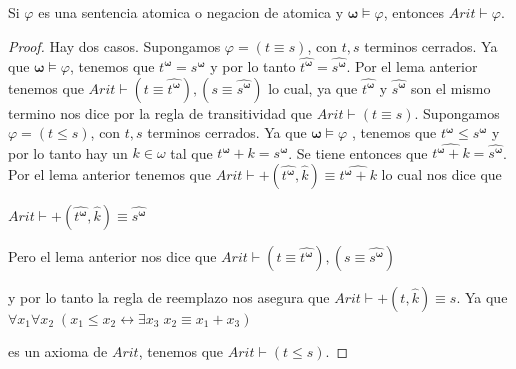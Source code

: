   \begin{lemma}
    Si \(\varphi \) es una sentencia atomica o negacion de atomica y \(\mathbf{ \omega }\models \varphi \), entonces \(Arit\vdash \varphi \).
  \end{lemma}
  \begin{proof}
    Hay dos casos. Supongamos \(\varphi =(t\equiv s)\), con \(t,s\) terminos cerrados. Ya que \(\mathbf{\omega }\models \varphi \), tenemos que \(t^{\mathbf{ \omega }}=s^{\mathbf{\omega }}\) y por lo tanto \(\widehat{t^{\mathbf{\omega }} }=\widehat{s^{\mathbf{\omega }}}\). Por el lema anterior tenemos que \( Arit\vdash (t\equiv \widehat{t^{\mathbf{\omega }}}),(s\equiv \widehat{s^{ \mathbf{\omega }}})\) lo cual, ya que \(\widehat{t^{\mathbf{\omega }}}\) y \( \widehat{s^{\mathbf{\omega }}}\) son el mismo termino nos dice por la regla de transitividad que \(Arit\vdash (t\equiv s)\). Supongamos \(\varphi =(t\leq s) \), con \(t,s\) terminos cerrados. Ya que \(\mathbf{\omega }\models \varphi \) , tenemos que \(t^{\mathbf{\omega }}\leq s^{\mathbf{\omega }}\) y por lo tanto hay un \(k\in \omega \) tal que \(t^{\mathbf{\omega }}+k=s^{\mathbf{\omega }}\). Se tiene entonces que \(\widehat{t^{\mathbf{\omega }}+k}=\widehat{s^{\mathbf{ \omega }}}\). Por el lema anterior tenemos que \(Arit\vdash +(\widehat{t^{ \mathbf{\omega }}},\widehat{k})\equiv \widehat{t^{\mathbf{\omega }}+k}\) lo cual nos dice que

    \(\displaystyle Arit\vdash +(\widehat{t^{\mathbf{\omega }}},\widehat{k})\equiv \widehat{s^{ \mathbf{\omega }}} \)

    Pero el lema anterior nos dice que
    \(\displaystyle Arit\vdash (t\equiv \widehat{t^{\mathbf{\omega }}}),(s\equiv \widehat{s^{ \mathbf{\omega }}}) \)

    y por lo tanto la regla de reemplazo nos asegura que \(Arit\vdash +(t, \widehat{k})\equiv s\). Ya que
    \(\displaystyle \forall x_{1}\forall x_{2}\;(x_{1}\leq x_{2}\leftrightarrow \exists x_{3}\;x_{2}\equiv x_{1}+x_{3}) \)

    es un axioma de \(Arit\), tenemos que \(Arit\vdash (t\leq s)\).
  \end{proof}

